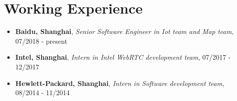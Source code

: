 \documentclass[letterpaper, UTF8]{article}
\begin{document}
	\section*{\textbf{Working Experience}}\vspace{-0.05in}
	\begin{itemize}
		\item \textbf{Baidu, Shanghai}, \emph{Senior Software Engineer in Iot team and Map team}, 07/2018 - present  \\
		\item \textbf{Intel, Shanghai}, \emph{Intern in Intel WebRTC development team}, 07/2017 - 12/2017  \\
		\item \textbf{Hewlett-Packard, Shanghai}, \emph{Intern in Software development team}, 08/2014 - 11/2014
	\end{itemize}
	\vspace{-0.32in}
	
\end{document}
